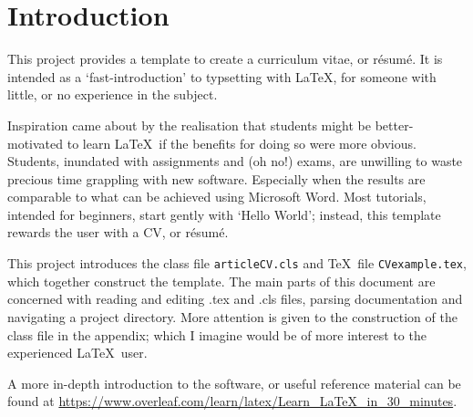 \section{Introduction}
This project provides a template to create a curriculum vitae, or r\'esum\'e. It is intended as a `fast-introduction' to typsetting with \LaTeX, for someone with little, or no experience in the subject. \par

Inspiration came about by the realisation that students might be better-motivated to learn \LaTeX~if the benefits for doing so were more obvious. Students, inundated with assignments and (oh no!) exams, are unwilling to waste precious time grappling with new software. Especially when the results are comparable to what can be achieved using Microsoft Word. Most tutorials, intended for beginners, start gently with `Hello World'; instead, this template rewards the user with a CV, or r\'esum\'e. \par

This project introduces the class file \lstinline|articleCV.cls| and \TeX~file \lstinline|CVexample.tex|, which together construct the template. The main parts of this document are concerned with reading and editing .tex and .cls files, parsing documentation and navigating a project directory. More attention is given to the construction of the class file in the appendix; which I imagine would be of more interest to the experienced \LaTeX~user. \par

A more in-depth introduction to the software, or useful reference material can be found at \url{https://www.overleaf.com/learn/latex/Learn\_LaTeX\_in\_30\_minutes}. \par